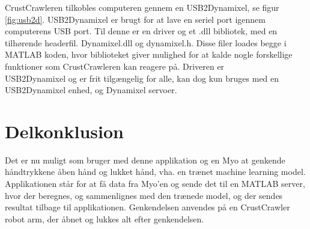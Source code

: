 
CrustCrawleren tilkobles computeren gennem en USB2Dynamixel, se figur \ref{fig:usb2d}. USB2Dynamixel er brugt for at lave en seriel port igennem computerens USB port. Til denne er en driver og et .dll bibliotek, med en tilhørende headerfil. Dynamixel.dll og dynamixel.h. Disse filer loades begge i MATLAB koden, hvor biblioteket giver mulighed for at kalde nogle forskellige funktioner som CrustCrawleren kan reagere på. Driveren er\\ USB2Dynamixel \citep{agaverobot}  og er frit tilgængelig for alle, kan dog kun bruges med en USB2Dynamixel enhed, og Dynamixel servoer.

\section{Delkonklusion}
Det er nu muligt som bruger med denne applikation og en Myo at genkende håndtrykkene åben hånd og lukket hånd, vha. en trænet machine learning model. Applikationen står for at få data fra Myo'en og sende det til en MATLAB server, hvor der beregnes, og sammenlignes med den trænede model, og der sendes resultat tilbage til applikationen. Genkendelsen anvendes på en CrustCrawler robot arm, der åbnet og lukkes alt efter genkendelsen.